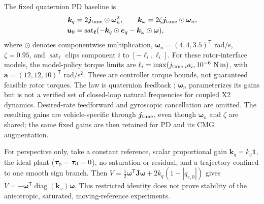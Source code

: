 \documentclass[letterpaper,10pt,conference]{IEEEtran}
\newcommand{\T}{^{\mathsf T}}
\newcommand{\sat}{\operatorname{sat}}
\begin{document}
The fixed quaternion PD baseline is
\begin{align}
 \bm k_q&=2\bm j_{\rm tune}\odot\bm\omega_n^2,\qquad
 \bm k_\omega=2\zeta\bm j_{\rm tune}\odot\bm\omega_n,\\
 \bm u_0&=\sat_{\bm\ell}
       (-\bm k_q\odot\bm e_q-\bm k_\omega\odot\bm\omega),
 \label{eq:pd}
\end{align}
where $\odot$ denotes componentwise multiplication,
$\bm\omega_n=(4,4,3.5)\T$ rad/s, $\zeta=0.95$, and
$\sat_{\bm\ell}$ clips component $i$ to $[-\ell_i,\ell_i]$.
For these rotor-interface models, the model-policy torque limits are
$\ell_i=\max(j_{{\rm tune},i}a_i,10^{-6}\ \mathrm{N\,m})$,
with $\bm a=(12,12,10)\T$ rad/s$^2$.
These are controller torque bounds, not guaranteed feasible rotor torques.
The law is quaternion feedback \cite{fresk2013quaternion};
$\bm\omega_n$ parameterizes its gains but is not a verified set of
closed-loop natural frequencies for coupled X2 dynamics.
Desired-rate feedforward and gyroscopic cancellation are omitted.
The resulting gains are vehicle-specific through $\bm j_{\rm tune}$, even though
$\bm\omega_n$ and $\zeta$ are shared; the same fixed gains are then retained
for PD and its CMG augmentation.

For perspective only, take a constant reference, scalar proportional
gain $\bm k_q=k_q\bm1$, the ideal plant
($\bm\tau_{\rm p}=\bm\tau_{\rm d}=0$), no saturation or residual, and a
trajectory confined to one smooth sign branch. Then
$V=\frac12\bm\omega\T\bm J\bm\omega+2k_q(1-|q_{e,0}|)$ gives
$\dot V=-\bm\omega\T\operatorname{diag}(\bm k_\omega)\bm\omega$.
This restricted identity does not prove stability of the anisotropic,
saturated, moving-reference experiments.
\end{document}
